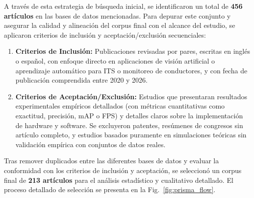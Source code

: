 A través de esta estrategia de búsqueda inicial, se identificaron un total de \textbf{456 artículos} en las bases de datos mencionadas. Para depurar este conjunto y asegurar la calidad y alineación del corpus final con el alcance del estudio, se aplicaron criterios de inclusión y aceptación/exclusión secuenciales:
\begin{enumerate}
    \item \textbf{Criterios de Inclusión:} Publicaciones revisadas por pares, escritas en inglés o español, con enfoque directo en aplicaciones de visión artificial o aprendizaje automático para ITS o monitoreo de conductores, y con fecha de publicación comprendida entre 2020 y 2026.
    \item \textbf{Criterios de Aceptación/Exclusión:} Estudios que presentaran resultados experimentales empíricos detallados (con métricas cuantitativas como exactitud, precisión, mAP o FPS) y detalles claros sobre la implementación de hardware y software. Se excluyeron patentes, resúmenes de congresos sin artículo completo, y estudios basados puramente en simulaciones teóricas sin validación empírica con conjuntos de datos reales.
\end{enumerate}

Tras remover duplicados entre las diferentes bases de datos y evaluar la conformidad con los criterios de inclusión y aceptación, se seleccionó un corpus final de \textbf{213 artículos} para el análisis estadístico y cualitativo detallado. El proceso detallado de selección se presenta en la Fig.~\ref{fig:prisma_flow}.

